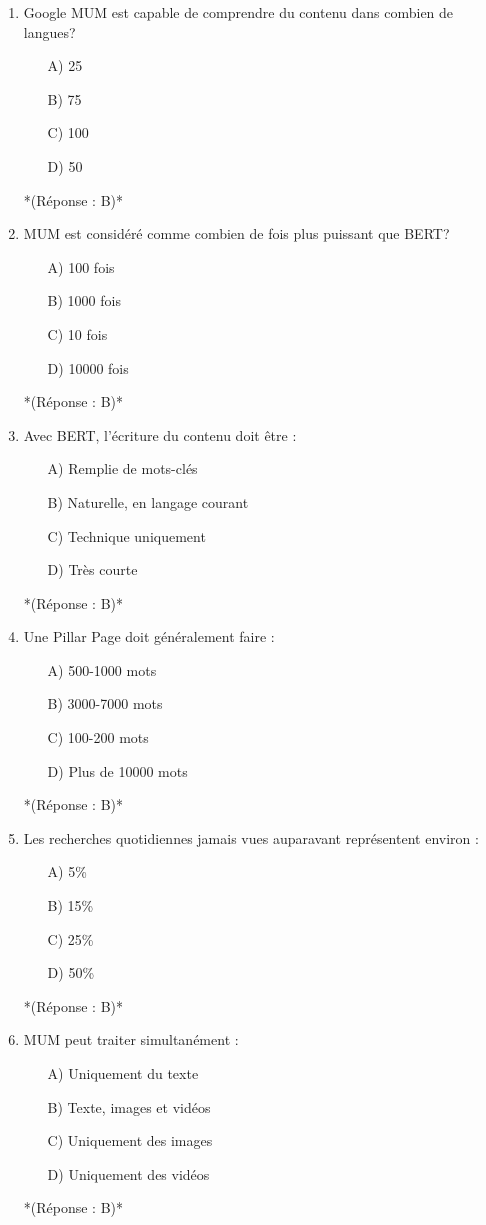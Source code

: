 \documentclass[12pt,a4paper,twoside]{report}
\begin{document}
\begin{enumerate}
\item Google MUM est capable de comprendre du contenu dans combien de langues?
\begin{itemize}
\item[A)] 25
\item[B)] 75
\item[C)] 100
\item[D)] 50
\end{itemize}
*(Réponse : B)*

\item MUM est considéré comme combien de fois plus puissant que BERT?
\begin{itemize}
\item[A)] 100 fois
\item[B)] 1000 fois
\item[C)] 10 fois
\item[D)] 10000 fois
\end{itemize}
*(Réponse : B)*

\item Avec BERT, l'écriture du contenu doit être :
\begin{itemize}
\item[A)] Remplie de mots-clés
\item[B)] Naturelle, en langage courant
\item[C)] Technique uniquement
\item[D)] Très courte
\end{itemize}
*(Réponse : B)*

\item Une Pillar Page doit généralement faire :
\begin{itemize}
\item[A)] 500-1000 mots
\item[B)] 3000-7000 mots
\item[C)] 100-200 mots
\item[D)] Plus de 10000 mots
\end{itemize}
*(Réponse : B)*

\item Les recherches quotidiennes jamais vues auparavant représentent environ :
\begin{itemize}
\item[A)] 5\%
\item[B)] 15\%
\item[C)] 25\%
\item[D)] 50\%
\end{itemize}
*(Réponse : B)*

\item MUM peut traiter simultanément :
\begin{itemize}
\item[A)] Uniquement du texte
\item[B)] Texte, images et vidéos
\item[C)] Uniquement des images
\item[D)] Uniquement des vidéos
\end{itemize}
*(Réponse : B)*


\end{enumerate}
\end{document}
